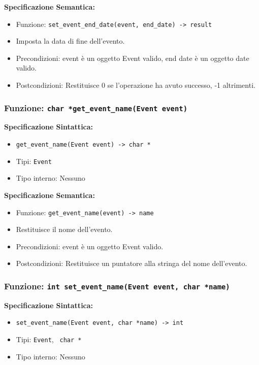 \documentclass[11pt]{scrartcl} %
\begin{document}
\textbf{Specificazione Semantica:}
\begin{itemize}
\item Funzione: \texttt{set\_event\_end\_date(event, end\_date) -> result}
\item Imposta la data di fine dell'evento.
\item Precondizioni: event è un oggetto Event valido, end date è un oggetto date valido.
\item Postcondizioni: Restituisce 0 se l'operazione ha avuto successo, -1 altrimenti.
\end{itemize}

\subsubsection{Funzione: \texttt{char *get\_event\_name(Event event)}}

\textbf{Specificazione Sintattica:}
\begin{itemize}
\item \texttt{get\_event\_name(Event event) ->  char *}
\item Tipi: \texttt{Event}
\item Tipo interno: Nessuno
\end{itemize}

\textbf{Specificazione Semantica:}
\begin{itemize}
\item Funzione: \texttt{get\_event\_name(event) -> name}
\item Restituisce il nome dell'evento.
\item Precondizioni: event è un oggetto Event valido.
\item Postcondizioni: Restituisce un puntatore alla stringa del nome dell'evento.
\end{itemize}

\subsubsection{Funzione: \texttt{int set\_event\_name(Event event,  char *name)}}

\textbf{Specificazione Sintattica:}
\begin{itemize}
\item \texttt{set\_event\_name(Event event,  char *name) -> int}
\item Tipi: \texttt{Event}, \texttt{ char *}
\item Tipo interno: Nessuno
\end{itemize}
\end{document}
